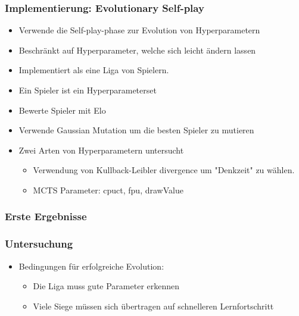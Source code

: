 \begin{frame}
 \frametitle{Implementierung: Evolutionary Self-play}
  


\begin{itemize}
  \item \pause Verwende die Self-play-phase zur Evolution von Hyperparametern
  \item \pause Beschränkt auf Hyperparameter, welche sich leicht ändern lassen
  \item \pause Implementiert als eine Liga von Spielern.
  \item \pause Ein Spieler ist ein Hyperparameterset
  \item \pause Bewerte Spieler mit Elo
  \item \pause Verwende Gaussian Mutation um die besten Spieler zu mutieren
\end{itemize}

\begin{itemize}
  \item \pause Zwei Arten von Hyperparametern untersucht
\begin{itemize}
  \item \pause Verwendung von Kullback-Leibler divergence um "Denkzeit" zu wählen.
  \item \pause MCTS Parameter: cpuct, fpu, drawValue
\end{itemize}
\end{itemize}

  
\end{frame}
\begin{frame}
 \frametitle{Erste Ergebnisse}
  



  
\end{frame}
\begin{frame}
 \frametitle{Untersuchung}
  


\begin{itemize}
  \item \pause Bedingungen für erfolgreiche Evolution:
\begin{itemize}
  \item \pause Die Liga muss gute Parameter erkennen
  \item \pause Viele Siege müssen sich übertragen auf schnelleren Lernfortschritt
\end{itemize}
\end{itemize}

  
\end{frame}
